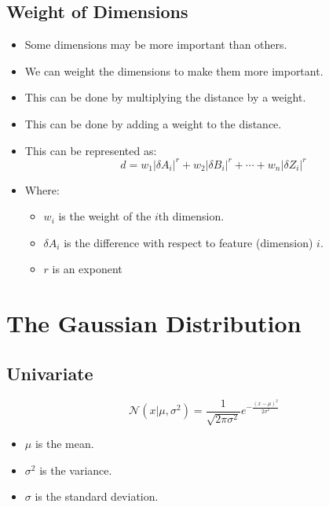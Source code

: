 \documentclass[12pt]{article}
\begin{document}
        \subsection{Weight of Dimensions}
            \begin{itemize}
                \item Some dimensions may be more important than others.
                \item We can weight the dimensions to make them more important.
                \item This can be done by multiplying the distance by a weight.
                \item This can be done by adding a weight to the distance.
                \item This can be represented as:
                \begin{equation}
                    d = w_1{\left|\delta{}A_i\right|}^r + w_2{\left|\delta{}B_i\right|}^r + \cdots + w_n{\left|\delta{}Z_i\right|}^r
                \end{equation}
                \item Where:
                \begin{itemize}
                    \item $w_i$ is the weight of the $i$th dimension.
                    \item $\delta{}A_i$ is the difference with respect to feature (dimension) $i$.
                    \item $r$ is an exponent
                \end{itemize}
            \end{itemize}
    \section{The Gaussian Distribution}
        \subsection{Univariate}
            \begin{equation}
                \mathcal{N}(x | \mu, \sigma^2) = \frac{1}{\sqrt{2\pi\sigma^2}}e^{-\frac{{(x - \mu)}^2}{2\sigma^2}}
            \end{equation}
            \begin{itemize}
                \item $\mu$ is the mean.
                \item $\sigma^2$ is the variance.
                \item $\sigma$ is the standard deviation.
            \end{itemize}
\end{document}
